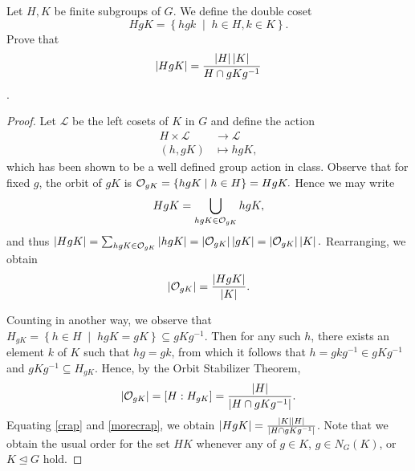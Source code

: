 \documentclass[10pt]{amsart}
\begin{document}
\begin{thm}
  Let $H, K$ be finite subgroups of $G$.  
  We define the double coset $$HgK = \left\{hgk \;\middle\vert\; h\in H, k \in K\right\}.$$
  Prove that $$\left| HgK \right| = \frac{\left| H \right|\left| K \right|}{H \cap gKg^{-1}}$$.
  \begin{proof}
    Let $\mathcal{L}$ be the left cosets of $K$ in $G$ and define the action
    \begin{align*}
      H \times \mathcal{L} &\rightarrow \mathcal{L}\\
      (h,gK) &\mapsto hgK,
    \end{align*}
    which has been shown to be a well defined group action in class.
    Observe that for fixed $g$, the orbit of $gK$ is $\mathcal{O}_{gK} = \left\{hgK \;\middle\vert\; h \in H\right\} = HgK.$
    Hence we may write $$HgK = \bigcup_{hgK \in \mathcal{O}_{gK}} hgK,$$
    and thus $\left| HgK \right| = \sum_{hgK \in \mathcal{O}_{gK}} \left| hgK \right| = \left| \mathcal{O}_{gK} \right|\left| gK \right| = \left| \mathcal{O}_{gK} \right|\left| K \right|.$
    Rearranging, we obtain 
    \begin{equation}\label{crap}
      \left| \mathcal{O}_{gK} \right| = \frac{\left| HgK \right|}{\left| K \right|}.
    \end{equation}
    
    Counting in another way, we observe that $H_{gK} = \left\{h \in H \;\middle\vert\; hgK = gK\right\} \subseteq gKg^{-1}$.
    Then for any such $h$, there exists an element $k$ of $K$ such that $hg = gk$, from which it follows that $h = gkg^{-1} \in gKg^{-1}$ and $gKg^{-1} \subseteq H_{gK}$.
    Hence, by the Orbit Stabilizer Theorem, 
    \begin{equation}\label{morecrap}
      \left| \mathcal{O}_{gK} \right| = [H : H_{gK}] = \frac{\left| H \right|}{\left| H \cap gKg^{-1} \right|}.
    \end{equation}
    Equating \eqref{crap} and \eqref{morecrap}, we obtain $\left| HgK \right| = \frac{\left| K \right|\left| H \right|}{\left| H \cap gKg^{-1} \right|}$.
    Note that we obtain the usual order for the set $HK$ whenever any of $g \in K$, $g \in N_G(K)$, or $K \unlhd G$ hold.
  \end{proof}
\end{thm}
\end{document}
